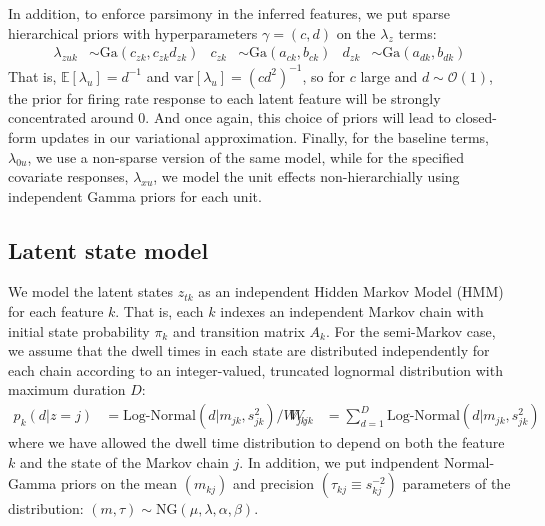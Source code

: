\documentclass{article} %
\begin{document}
In addition, to enforce parsimony in the inferred features, we put sparse hierarchical priors with hyperparameters $\gamma = (c, d)$ on the $\lambda_z$ terms:
\begin{align}
    \label{hierarchy}
    \lambda_{zuk} &\sim \text{Ga}(c_{zk}, c_{zk} d_{zk}) & c_{zk} &\sim \text{Ga}(a_{ck}, b_{ck})
    & d_{zk} &\sim \text{Ga}(a_{dk}, b_{dk})
\end{align}
That is, $\mathbb{E}[\lambda_u] = d^{-1}$ and $\text{var}[\lambda_u] = (cd^2)^{-1}$, so for $c$ large and $d\sim \mathcal{O}(1)$, the prior for firing rate response to each latent feature will be strongly concentrated around 0. And once again, this choice of priors will lead to closed-form updates in our variational approximation. Finally, for the baseline terms, $\lambda_{0u}$, we use a non-sparse version of the same model, while for the specified covariate responses, $\lambda_{xu}$, we model the unit effects non-hierarchially using independent Gamma priors for each unit.

\subsection{Latent state model}
We model the latent states $z_{tk}$ as an independent Hidden Markov Model (HMM) for each feature $k$. That is, each $k$ indexes an independent Markov chain with initial state probability $\pi_k$ and transition matrix $A_k$. For the semi-Markov case, we assume that the dwell times in each state are distributed independently for each chain according to an integer-valued, truncated lognormal distribution with maximum duration $D$:
\begin{align}
    \label{semi-markov}
    p_k(d|z = j) &= \text{Log-Normal}(d|m_{jk}, s^2_{jk}) / W_{jk}  &
    W_{jk} &= \sum_{d = 1}^D \text{Log-Normal}(d|m_{jk}, s^2_{jk}) 
\end{align}
where we have allowed the dwell time distribution to depend on both the feature $k$ and the state of the Markov chain $j$. In addition, we put indpendent Normal-Gamma priors on the mean $(m_{kj})$ and precision $(\tau_{kj} \equiv s_{kj}^{-2})$ parameters of the distribution: $(m, \tau) \sim \text{NG}(\mu, \lambda, \alpha, \beta)$.
\end{document}
